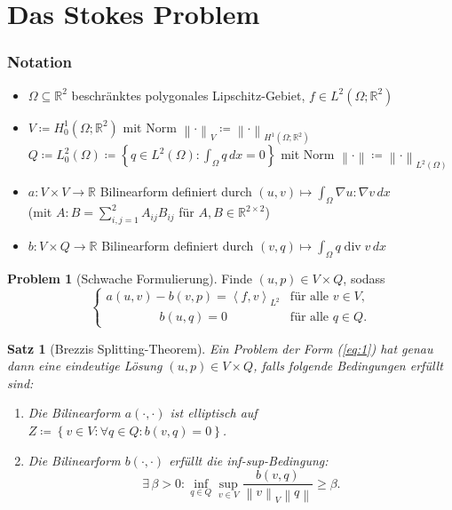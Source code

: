 \documentclass[a4paper, 10pt]{article}
\newcommand{\real}{\mathbb{R}}
\newcommand{\norm}[1][\cdot]{\left\lVert#1\right\rVert}
\newcommand{\set}[1]{\left\{#1\right\}}
\newcommand{\dx}{\,dx}
\newcommand{\aop}[2]{a\left(#1, #2 \right)}
\newcommand{\bop}[2]{b\left(#1, #2 \right)}
\newcommand{\lprod}[2]{\left\langle#1, #2 \right\rangle_{L^2}}
\DeclareMathOperator{\divop}{div}
\theoremstyle{definition}
\newtheorem{problem}{Problem}
\theoremstyle{plain}
\newtheorem*{satz*}{Satz}
\begin{document}
\section{Das Stokes Problem}
\label{sec:das-stokes-problem}

\subsubsection*{Notation}
\label{sec:notation}

\begin{itemize}
\item \(\Omega \subseteq \real^2\) beschränktes polygonales
  Lipschitz-Gebiet, \(f \in L^2(\Omega; \real^2)\) 
\item \(V\coloneqq H^1_0(\Omega; \real^2)\) mit Norm \(\norm_V
  \coloneqq \norm_{H^1(\Omega; \real^2)}\)\\
  \(Q\coloneqq L^2_0(\Omega) \coloneqq  \set{q \in L^2(\Omega):
    \int_\Omega q \dx = 0}\) mit Norm \(\norm \coloneqq \norm_{L^2(\Omega)}\)
\item \(a\colon V\times V \to \real\) Bilinearform definiert durch \((u,v) \mapsto \int_\Omega
  \nabla{u} : \nabla{v}\dx \) \\(mit \(A:B = \sum_{i,j = 1}^2 A_{ij}B_{ij}\) für \(A,B \in \real^{2\times2}\))
\item \(b\colon V\times Q \to \real\) Bilinearform definiert durch \((v,q) \mapsto \int_\Omega q
  \divop v\dx\)
\end{itemize}

\begin{problem}[Schwache Formulierung] \label{pro:1}
  Finde \((u,p)\in V\times Q\), sodass 
  \begin{equation}
    \label{eq:1}
    \begin{cases}
      \aop{u}{v} - \bop{v}{p} = \lprod{f}{v} & \text{für alle } v\in V, \\
      \qquad\qquad\; \bop{u}{q} = 0          & \text{für alle } q\in Q. 
    \end{cases}
  \end{equation}
\end{problem}

\begin{satz*}[Brezzis Splitting-Theorem] \label{thm:1}
  Ein Problem der Form (\ref{eq:1}) hat genau dann eine eindeutige
  Lösung \((u,p) \in V\times Q\), falls folgende Bedingungen erfüllt
  sind: 
  \begin{enumerate}[label=(\roman*)]
  \item Die Bilinearform \(a(\cdot, \cdot)\) ist elliptisch auf \(Z
    \coloneqq \set{v \in V\colon \forall q \in Q\colon \bop{v}{q} = 0}\).
  \item Die Bilinearform \(\bop{\cdot}{\cdot}\) erfüllt die
    \emph{inf-sup-Bedingung}: 
    \[
      \exists\, \beta > 0: \inf_{q\in Q} \sup_{v\in V} \frac{\bop{v}{q}} {\norm[v]_V\norm[q]} \geq \beta.
      \]
  \end{enumerate}
\end{satz*}
\end{document}
